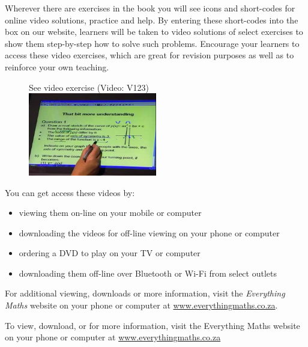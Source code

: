 {\Large

Wherever there are exercises in the book you will see icons and short-codes for online video solutions,
practice and help. By entering these short-codes into the box on our website, learners will be taken to video solutions of select exercises to show them
step-by-step how to solve such problems. Encourage your learners to access these video exercises, which are great for revision purposes as well as to reinforce your own teaching.\par

\begin{figure}[h]
\begin{center}
See video exercise  (Video: V123)\\ 
\includegraphics[width=0.5\textwidth]{../title_images/mindsetexercise.png}
\end{center}
\end{figure}

You can get access these videos by:
\begin{itemize}[noitemsep]
    \item viewing them on-line on your mobile or computer
    \item downloading the videos for off-line viewing on your phone or computer
    \item ordering a DVD to play on your TV or computer
    \item downloading them off-line over Bluetooth or Wi-Fi from select outlets
\end{itemize}
For additional viewing, downloads or more information, visit the \textit{Everything Maths} website on your phone or computer at \underline{www.everythingmaths.co.za}.


To view, download, or for more information, visit the Everything Maths website on your phone or
computer at \underline{www.everythingmaths.co.za}  \par
\vspace*{1cm}
}



